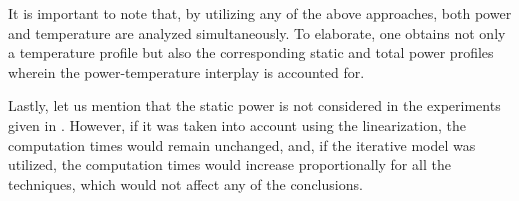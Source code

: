 It is important to note that, by utilizing any of the above approaches, both
power and temperature are analyzed simultaneously. To elaborate, one obtains not
only a temperature profile but also the corresponding static and total power
profiles wherein the power-temperature interplay is accounted for.

Lastly, let us mention that the static power is not considered in the
experiments given in . However, if it was
taken into account using the linearization, the computation times would remain
unchanged, and, if the iterative model was utilized, the computation times would
increase proportionally for all the techniques, which would not affect any of
the conclusions.
